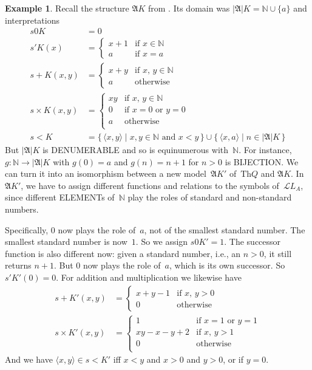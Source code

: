 \documentclass[10pt,a4paper]{article}
\makeatletter
\newcommand*{\olup}[1]{\MakeUppercase{#1}}
\theoremstyle{plain}
\theoremstyle{definition}
\newtheorem{ex}[thm]{Example}
\theoremstyle{remark}
\newcommand*{\ollabel}[1]{\label{#1}}
\newcommand{\olref}{\@ifnextchar[{\olref@i}{\olref@final}}
\def\olref@i[#1]{\@ifnextchar[{\olref@ii}{\olref@final}}
\def\olref@ii[#1]{\@ifnextchar[{\olref@iii}{\olref@final}}
\def\olref@iii[#1]{\olref@final}
\def\olref@final#1{\ref{#1}}
\providecommand{\Obj}{}
\providecommand{\Struct}{\ensuremath{\mathfrak{A}}}
\providecommand{\Domain}{\ensuremath{|\mathfrak{A}|}}
\providecommand{\Assign}{\ensuremath{s}}
\providecommand{\Lang}{\ensuremath{\mathcal{L}}}
\providecommand{\Th}{\ensuremath{\mathrm{Th}}}
\providecommand{\tuple}[1]{\langle #1 \rangle}
\providecommand{\Nat}{\ensuremath{\mathbb{N}}}
\providecommand{\Setabs}[2]{\{\, #1 \mid #2 \,\}}
\makeatother
\begin{document}
\begin{ex}\ollabel{ex:comp-model-q}
Recall the structure $\Struct{K}$ from \olref[mdq]{ex:model-K-of-Q}.
Its domain was $\Domain{K} = \Nat
\cup \{a\}$ and interpretations
\begin{align*}
  \Assign{\Obj{0}}{K} & = 0\\
  \Assign{\prime}{K}(x) & =
  \begin{cases}
    x+1 & \text{if $x\in \Nat$}\\
    a & \text{if $x = a$}
  \end{cases}\\
  \Assign{+}{K}(x, y) & =
  \begin{cases}
    x+y & \text{if $x$, $y \in\Nat$}\\
    a & \text{otherwise}
  \end{cases}\\
  \Assign{\times}{K}(x, y) & =
  \begin{cases}
    xy & \text{if $x$, $y \in\Nat$}\\
    0 & \text{if $x=0$ or $y=0$}\\
    a & \text{otherwise}\\
  \end{cases}\\
  \Assign{<}{K} & =
  \Setabs{\tuple{x,y}}{x, y \in \Nat \text{ and } x<y} \cup
  \Setabs{\tuple{x,a}}{n \in \Domain{K}}
\end{align*}
But $\Domain{K}$ is \olup{denumerable} and so is equinumerous
with~$\Nat$. For instance, $g\colon \Nat \to \Domain{K}$ with $g(0) =
a$ and $g(n) = n+1$ for $n>0$ is \olup{bijection}.  We can turn it into
an isomorphism between a new model~$\Struct{K'}$ of~$\Th{Q}$ and
$\Struct{K}$.  In $\Struct{K'}$, we have to assign different functions
and relations to the symbols of~$\Lang{L_A}$, since different
\olup{element}s of~$\Nat$ play the roles of standard and non-standard
numbers.

Specifically, $0$ now plays the role of~$a$, not of the smallest
standard number. The smallest standard number is now~$1$. So we assign
$\Assign{\Obj{0}}{K'} = 1$. The successor function is also different
now: given a standard number, i.e., an $n > 0$, it still returns
$n+1$. But $0$ now plays the role of~$a$, which is its own
successor. So $\Assign{\prime}{K'}(0) = 0$.  For addition and
multiplication we likewise have
\begin{align*}
\Assign{+}{K'}(x, y) & =
  \begin{cases}
    x+y-1 & \text{if $x$, $y >0$}\\
    0 & \text{otherwise}
  \end{cases}\\
  \Assign{\times}{K'}(x, y) & =
  \begin{cases}
    1 & \text{if $x = 1$ or $y = 1$}\\
    xy - x - y + 2 & \text{if $x$, $y > 1$}\\
    0 & \text{otherwise}\\
  \end{cases}
\end{align*}
And we have $\tuple{x, y} \in \Assign{<}{K'}$ iff $x < y$ and $x > 0$
and $y > 0$, or if $y = 0$.


\end{ex}
\end{document}
